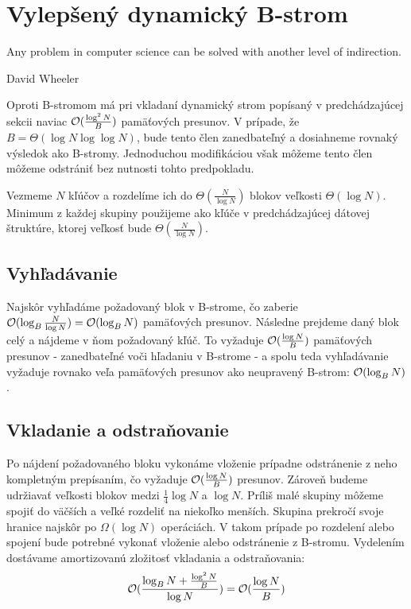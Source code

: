 
\section{Vylepšený dynamický B-strom}
\epigraph{Any problem in computer science can be solved with another level of indirection.}{David Wheeler}
Oproti \aware B-stromom má pri vkladaní \obliv dynamický strom popísaný v predchádzajúcej sekcii naviac $\mathcal{O}(\frac{\log^2{N}}{B})$ pamäťových presunov. V prípade, že $B=\Theta(\log{N}\log\log{N})$, bude tento člen zanedbateľný a dosiahneme rovnaký výsledok ako \aware B-stromy. Jednoduchou modifikáciou však môžeme tento člen môžeme odstrániť bez nutnosti tohto predpokladu.

Vezmeme $N$ kľúčov a rozdelíme ich do $\Theta(\frac{N}{\log{N}})$ blokov veľkosti $\Theta(\log{N})$. Minimum z každej skupiny použijeme ako kľúče v predchádzajúcej dátovej štruktúre, ktorej veľkosť bude $\Theta(\frac{N}{\log{N}})$.

\subsection{Vyhľadávanie}
Najskôr vyhľadáme požadovaný blok v B-strome, čo zaberie $\mathcal{O}(\log_B{\frac{N}{\log{N}}}) = \mathcal{O}(\log_B{N})$ pamäťových presunov. Následne prejdeme daný blok celý a nájdeme v ňom požadovaný kľúč. To vyžaduje $\mathcal{O}(\frac{\log{N}}{B})$ pamäťových presunov - zanedbateľné voči hľadaniu v B-strome - a spolu teda vyhľadávanie vyžaduje rovnako veľa pamäťových presunov ako neupravený B-strom: $\mathcal{O}(\log_B{N})$. 

\subsection{Vkladanie a odstraňovanie}
Po nájdení požadovaného bloku vykonáme vloženie prípadne odstránenie z neho kompletným prepísaním, čo vyžaduje $\mathcal{O}(\frac{\log{N}}{B})$ presunov. Zároveň budeme udržiavať veľkosti blokov medzi $\frac{1}{4}\log{N}$ a $\log{N}$. Príliš malé skupiny môžeme spojiť do väčších a veľké rozdeliť na niekoľko menších. Skupina prekročí svoje hranice najskôr po $\Omega(\log{N})$ operáciách. V takom prípade po rozdelení alebo spojení bude potrebné vykonať vloženie alebo odstránenie z B-stromu. Vydelením dostávame amortizovanú zložitosť vkladania a odstraňovania:
\[
\mathcal{O}(\frac{\log_B{N} + \frac{\log^2{N}}{B}}{\log{N}}) = \mathcal{O}(\frac{\log{N}}{B})
\]

